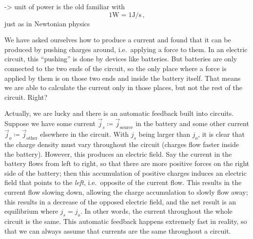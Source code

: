 \documentclass[../class_mech_main.tex]{subfiles}
\begin{document}
\begin{ex}
    -> unit of power is the old familiar  with
    \begin{equation}
        1 \unit{\watt} = 1 \unit{\joule \per \second} \, ,
    \end{equation}
    just as in Newtonian physics
\end{ex}



We have asked ourselves how to produce a current and found that it can be produced by pushing charges around, i.e.~applying a force to them. In an electric circuit, this \enquote{pushing} is done by devices like batteries. But batteries are only connected to the two ends of the circuit, so the only place where a force is applied by them is on those two ends and inside the battery itself. That means we are able to calculate the current only in those places, but not the rest of the circuit. Right?

Actually, we are lucky and there is an automatic feedback built into circuits. Suppose we have some current $\vec{j}_s \coloneqq \vec{j}_\text{source}$ in the battery and some other current $\vec{j}_o \coloneqq \vec{j}_\text{other}$ elsewhere in the circuit. With $j_s$ being larger than $j_o$, it is clear that the charge density must vary throughout the circuit (charges flow faster inside the battery). However, this produces an electric field. Say the current in the battery flows from left to right, so that there are more positive forces on the right side of the battery; then this accumulation of positive charges induces an electric field that points to the \emph{left}, i.e.~opposite of the current flow. This results in the current flow slowing down, allowing the charge accumulation to slowly flow away; this results in a decrease of the opposed electric field, and the net result is an equilibrium where $j_s = j_o$. In other words, the current throughout the whole circuit is the same. This automatic feedback happens extremely fast in reality, so that we can always assume that currents are the same throughout a circuit.
\end{document}
